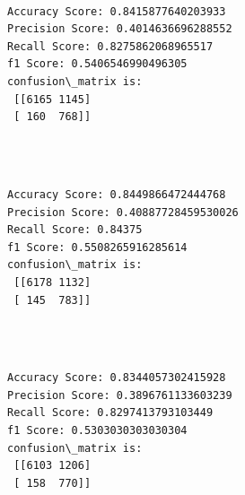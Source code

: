 \documentclass[11pt]{article}
\begin{document}
    \begin{center}
    \end{center}
    { \hspace*{\fill} \\}
    
    \begin{Verbatim}[commandchars=\\\{\}]
Accuracy Score: 0.8415877640203933
Precision Score: 0.4014636696288552
Recall Score: 0.8275862068965517
f1 Score: 0.5406546990496305
confusion\_matrix is: 
 [[6165 1145]
 [ 160  768]] 


    \end{Verbatim}

    \begin{center}
    \end{center}
    { \hspace*{\fill} \\}
    
    \begin{Verbatim}[commandchars=\\\{\}]
Accuracy Score: 0.8449866472444768
Precision Score: 0.40887728459530026
Recall Score: 0.84375
f1 Score: 0.5508265916285614
confusion\_matrix is: 
 [[6178 1132]
 [ 145  783]] 


    \end{Verbatim}

    \begin{center}
    \end{center}
    { \hspace*{\fill} \\}
    
    \begin{Verbatim}[commandchars=\\\{\}]
Accuracy Score: 0.8344057302415928
Precision Score: 0.3896761133603239
Recall Score: 0.8297413793103449
f1 Score: 0.5303030303030304
confusion\_matrix is: 
 [[6103 1206]
 [ 158  770]] 


    \end{Verbatim}

    \begin{center}
    \end{center}
    { \hspace*{\fill} \\}
    
\end{document}
